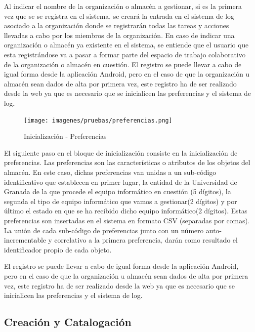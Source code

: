 \documentclass[a4paper,11pt]{book}
\begin{document}
Al indicar el nombre de la organización o almacén a gestionar, si es la primera vez que se se registra en el sistema, se creará la entrada en el sistema de log asociado  a la organización donde se registrarán todas las tareas y acciones llevadas a cabo por los miembros de la organización. En caso de indicar una organización o almacén ya existente en el sistema, se entiende que el usuario que esta registrándose va a pasar a formar parte del espacio de trabajo colaborativo de la organización o almacén en cuestión. El registro se puede llevar a cabo de igual forma desde la aplicación Android, pero en el caso de que la organización u almacén sean dados de alta por primera vez, este registro ha de ser realizado desde la web ya que es necesario que se inicialicen las preferencias y el sistema de log.

\begin{figure}[H] 
\centering 
\texttt{[image: imagenes/pruebas/preferencias.png]}
\caption{ Inicialización - Preferencias}
\end{figure}

El siguiente paso en el bloque de inicialización consiste en la inicialización de preferencias. Las preferencias son las características o atributos de los objetos del almacén. En este caso, dichas preferencias van unidas a un sub-código identificativo que establecen en primer lugar, la entidad de la Universidad de Granada de la que procede el equipo informático en cuestión (5 dígitos), la segunda el tipo de equipo informático que vamos a gestionar(2 dígitos) y por último el estado en que se ha recibido dicho equipo informático(2 dígitos). Estas preferencias son insertadas en el sistema en formato CSV (separadas por comas). La unión de cada sub-código de preferencias junto con un número auto-incrementable y correlativo a  la primera preferencia, darán como resultado el identificador propio de cada objeto. 

El registro se puede llevar a cabo de igual forma desde la aplicación Android, pero en el caso de que la organización u almacén sean dados de alta por primera vez, este registro ha de ser realizado desde la web ya que es necesario que se inicialicen las preferencias y el sistema de log.


\subsection{Creación y Catalogación}
\end{document}
